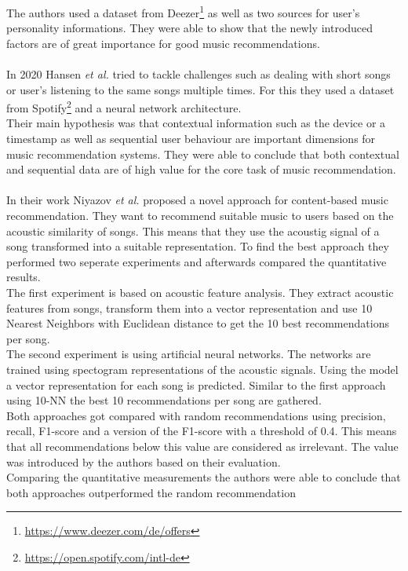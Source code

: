 \documentclass[runningheads,a4paper]{llncs}
\begin{document}
The authors used a dataset from Deezer\footnote{\url{https://www.deezer.com/de/offers}} as well as two sources for 
user's personality informations. 
They were able to show that the newly introduced factors are of great importance for good music recommendations. \cite{moscato2020emotional}\\
\\
In 2020 Hansen \textit{et al.} tried to tackle challenges such as dealing with short songs or user's listening to the same songs multiple times.
For this they used a dataset from Spotify\footnote{\url{https://open.spotify.com/intl-de}} and a neural network architecture. \\
Their main hypothesis was that contextual information such as the device or a timestamp as well as sequential user behaviour are 
 important dimensions for music recommendation systems.
They were able to conclude that both contextual and sequential data are of high value for the core task of music recommendation. 
\cite{hansen2020contextual}\\
\\
In their work Niyazov \textit{et al.} proposed a novel approach for content-based music recommendation. 
They want to recommend suitable music to users based on the acoustic similarity of songs.
This means that they use the acoustig signal of a song transformed into a suitable representation. 
To find the best approach they performed two seperate experiments and afterwards compared the quantitative results.\\
The first experiment is based on acoustic feature analysis. 
They extract acoustic features from songs, transform them into a vector representation and use 10 Nearest Neighbors with Euclidean distance 
to get the 10 best recommendations per song. \\
The second experiment is using artificial neural networks. 
The networks are trained using spectogram representations of the acoustic signals.
Using the model a vector representation for each song is predicted. 
Similar to the first approach using 10-NN the best 10 recommendations per song are gathered. \\
Both approaches got compared with random recommendations using precision, recall, F1-score and a version of the F1-score with a threshold of 0.4.
This means that all recommendations below this value are considered as irrelevant. The value was introduced by the authors based on their evaluation.\\
Comparing the quantitative measurements the authors were able to conclude that both approaches outperformed the random recommendation
\end{document}
